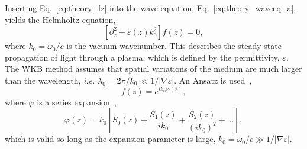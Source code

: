 Inserting Eq.~\ref{eq:theory_fz} into the wave equation, Eq.~\ref{eq:theory_waveeq_a}, yields the Helmholtz equation,
\begin{equation}
    \label{eq:theory_Helmholtz}
    \left[ \partial_z^2 + \varepsilon(z)k_0^2 \right] f(z) = 0,
\end{equation}
where $k_0=\omega_0/c$ is the vacuum wavenumber.
This describes the steady state propagation of light through a plasma, which is defined by the permittivity, $\varepsilon$.
The WKB method assumes that spatial variations of the medium are much larger than the wavelength, \textit{i.e.} $\lambda_0 = 2\pi /k_0 \ll 1/|\nabla\varepsilon|$.
An Ansatz is used~\cite{michel_introduction_2023},
\begin{equation}
    \label{eq:theory_Helmholtz_ansatz}
    f(z) = e^{i k_0 \varphi (z)},
\end{equation}
where $\varphi$ is a series expansion~\cite{colaitis_modeling_2014},
\begin{equation}
    \label{eq:theory_S_expansion}
    \varphi(z) = k_0 \left[ S_0 (z) + \frac{S_1 (z)}{i k_0} + \frac{S_2 (z)}{(i k_0)^2} + \dots \right],
\end{equation}
which is valid so long as the expansion parameter is large, $k_0=\omega_0/c \gg 1/|\nabla \varepsilon|$.

